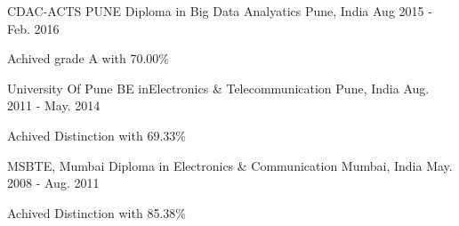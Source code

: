 

\begin{cventries}

 \cventry
    {CDAC-ACTS PUNE} %
    {Diploma in Big Data Analyatics} %
    {Pune, India} %
    {Aug 2015 - Feb. 2016} %
    {
      \begin{cvitems} %
        \item {Achived grade A with 70.00\%}
      \end{cvitems}
    }

  \cventry
    {University Of Pune} %
    {BE inElectronics \& Telecommunication} %
    {Pune, India} %
    {Aug. 2011 - May. 2014} %
    {
      \begin{cvitems} %
        \item {Achived Distinction with 69.33\%}
      \end{cvitems}
    }

  \cventry
    {MSBTE, Mumbai} %
    {Diploma in  Electronics \& Communication} %
    {Mumbai, India} %
    {May. 2008 - Aug. 2011} %
    {
      \begin{cvitems} %
        \item {Achived Distinction with 85.38\%}
      \end{cvitems}
    }

\end{cventries}
